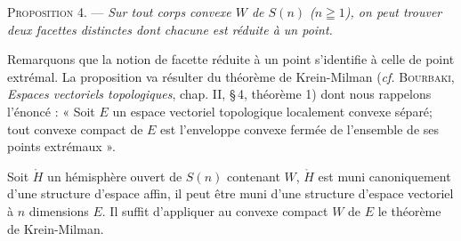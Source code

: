\documentclass[11pt]{article}
\newenvironment{prop}[1][]{\par\medskip\noindent\textsc{Proposition #1.} --- \itshape}{\par\medskip}
\newenvironment{proof}[1][]{\par}{\par}
\begin{document}
\begin{prop}[4]
Sur tout corps convexe $W$ de $S(n)$ ($n\geqq 1$), on peut trouver deux facettes distinctes dont
chacune est réduite à un point.
\end{prop}

\begin{proof}
Remarquons que la notion de facette réduite à un point s'identifie à celle de point extrémal. La
proposition va résulter du théorème de Krein-Milman (\textit{cf.} \textsc{Bourbaki},
\textit{Espaces vectoriels topologiques}, chap. II, \S\,4, théorème 1) dont nous rappelons
l'énoncé : « Soit $E$ un espace vectoriel topologique localement convexe séparé; tout convexe
compact de $E$ est l'enveloppe convexe fermée de l'ensemble de ses points extrémaux ».

Soit $\mathring{H}$ un hémisphère ouvert de $S(n)$ contenant $W$, $\mathring{H}$ est muni
canoniquement d'une structure d'espace affin, il peut être muni d'une structure d'espace
vectoriel à $n$ dimensions $E$. Il suffit d'appliquer au convexe compact $W$ de $E$ le théorème de
Krein-Milman.
\end{proof}

\end{document}
